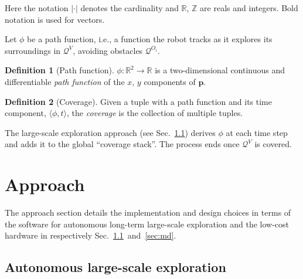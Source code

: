 \documentclass[lettersize,journal]{IEEEtran}
\theoremstyle{definition}
\newtheorem{defn}{Definition}[section]
\begin{document}
Here the notation $|\cdot|$ denotes the cardinality and $\mathbb{R}$, $\mathbb{Z}$ are reals and integers. Bold notation is used for vectors.

Let $\phi$ be a path function, i.e., a function the robot tracks as it explores its surroundings in $\mathcal{Q}^V$, avoiding %
obstacles $\mathcal{Q}^{O_i}$.

\begin{defn}[Path function]\label{def:pf}
  $\phi:\mathbb{R}^2\rightarrow\mathbb{R}$ is a two-dimensional continuous and differentiable \textit{path function} of the $x$, $y$ components of $\mathbf{p}$.
\end{defn}

\begin{defn}[Coverage]\label{def:co}
  Given a tuple with a path function and its time component, $\langle\phi,t\rangle$, the \textit{coverage} is the collection of multiple tuples.
\end{defn}

The large-scale exploration approach %
(see Sec.~\ref{sec:le}) derives $\phi$ at each time step and adds it to the global ``coverage stack''. The process ends once $\mathcal{Q}^V$ is covered.


\section{Approach}
\label{sec:m}

The approach section details the implementation and design choices in terms of %
the software for autonomous long-term large-scale exploration and the low-cost hardware in respectively Sec.~\ref{sec:le}~and~\ref{sec:md}.

\subsection{Autonomous large-scale exploration}
\label{sec:le}
\end{document}
